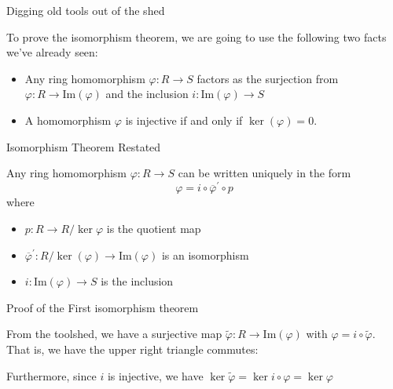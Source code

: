 \documentclass{beamer}
\begin{document}
\begin{frame}{Digging old tools out of the shed}

To prove the isomorphism theorem, we are going to use the following two facts we've already seen:

\begin{itemize}
\item Any ring homomorphism $\varphi:R\to S$ factors as the surjection from $\varphi:R \to \textrm{Im}(\varphi)$ and the inclusion $i:\textrm{Im}(\varphi)\to S$

\item A homomorphism $\varphi$ is injective if and only if $\ker(\varphi)=0$.

\end{itemize}



\end{frame}

\begin{frame}[fragile]{Isomorphism Theorem Restated}

Any ring homomorphism $\varphi:R\to S$ can be written uniquely in the form 
$$\varphi=i\circ\overline{\varphi}^\prime\circ p$$
 where
\begin{itemize}
\item $p:R\to R/\ker{\varphi}$ is the quotient map
\item $\overline{\varphi}^\prime:R/\ker(\varphi)\to \textrm{Im}(\varphi)$ is an isomorphism
\item $i:\textrm{Im}(\varphi)\to S$ is the inclusion
\end{itemize}
\begin{center}
\end{center}

\end{frame}


\begin{frame}[fragile]{Proof of the First isomorphism theorem}

From the toolshed, we have a surjective map $\tilde{\varphi}:R\to\textrm{Im}(\varphi)$ with $\varphi=i\circ\tilde{\varphi}$.  That is, we have the upper right triangle commutes:
\begin{center}
\end{center}

Furthermore, since $i$ is injective, we have $\ker{\tilde{\varphi}}=\ker{i\circ\varphi}=\ker{\varphi}$

\end{frame}
\end{document}
